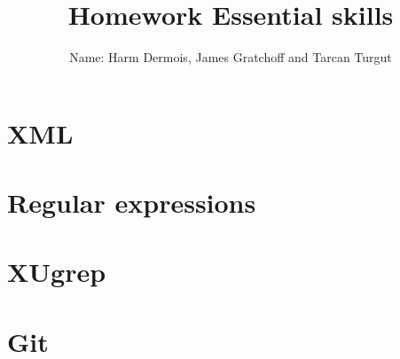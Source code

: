\documentclass[12pt,a4paper]{book}
\begin{document}
\title{Homework Essential skills}
\author{Name: Harm Dermois, James Gratchoff and Tarcan Turgut }
\date{}
\maketitle

\section{XML}

\section{Regular expressions}
\section{XUgrep}
\section{Git}
\end{document}
